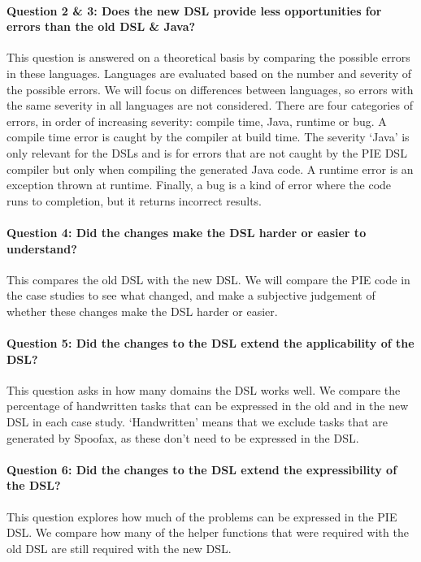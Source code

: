 \paragraph{Question 2 \& 3: Does the new \ac{DSL} provide less opportunities for errors than the old \ac{DSL} \& Java?}
This question is answered on a theoretical basis by comparing the possible errors in these languages.
Languages are evaluated based on the number and severity of the possible errors.
We will focus on differences between languages, so errors with the same severity in all languages are not considered.
There are four categories of errors, in order of increasing severity: compile time, Java, runtime or bug. 
A compile time error is caught by the compiler at build time.
The severity `Java' is only relevant for the \acp{DSL} and is for errors that are not caught by the \ac{PIE} \ac{DSL} compiler but only when compiling the generated Java code.
A runtime error is an exception thrown at runtime.
Finally, a bug is a kind of error where the code runs to completion, but it returns incorrect results.

\paragraph{Question 4: Did the changes make the \ac{DSL} harder or easier to understand?}
This compares the old \ac{DSL} with the new \ac{DSL}.
We will compare the \ac{PIE} code in the case studies to see what changed, and make a subjective judgement of whether these changes make the \ac{DSL} harder or easier. 

\paragraph{Question 5: Did the changes to the \ac{DSL} extend the applicability of the \ac{DSL}?}
This question asks in how many domains the \ac{DSL} works well.
We compare the percentage of handwritten tasks that can be expressed in the old and in the new \ac{DSL} in each case study.
`Handwritten' means that we exclude tasks that are generated by Spoofax, as these don't need to be expressed in the \ac{DSL}.

\paragraph{Question 6: Did the changes to the \ac{DSL} extend the expressibility of the \ac{DSL}?}
This question explores how much of the problems can be expressed in the \ac{PIE} \ac{DSL}.
We compare how many of the helper functions that were required with the old \ac{DSL} are still required with the new \ac{DSL}.

